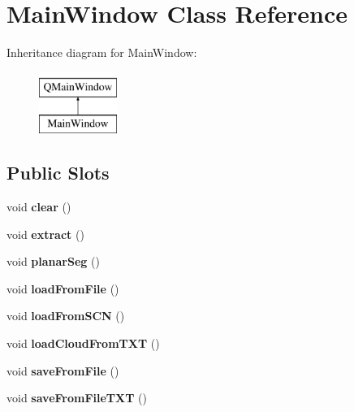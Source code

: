 \hypertarget{classMainWindow}{\section{Main\-Window Class Reference}
\label{classMainWindow}
}
Inheritance diagram for Main\-Window\-:\begin{figure}[H]
\begin{center}
\leavevmode
\includegraphics[height=2.000000cm]{classMainWindow}
\end{center}
\end{figure}
\subsection*{Public Slots}
\begin{DoxyCompactItemize}
\item 
\hypertarget{classMainWindow_a77557e32fb4ed3530daf2f6225c877db}{void {\bfseries clear} ()}\label{classMainWindow_a77557e32fb4ed3530daf2f6225c877db}

\item 
\hypertarget{classMainWindow_ad6bc77c2417da2a3728dd589c434dc6e}{void {\bfseries extract} ()}\label{classMainWindow_ad6bc77c2417da2a3728dd589c434dc6e}

\item 
\hypertarget{classMainWindow_ac47089e2ddbd6348bcd309f861da3a7d}{void {\bfseries planar\-Seg} ()}\label{classMainWindow_ac47089e2ddbd6348bcd309f861da3a7d}

\item 
\hypertarget{classMainWindow_a233bee15277ba8e4eebbb121bd547839}{void {\bfseries load\-From\-File} ()}\label{classMainWindow_a233bee15277ba8e4eebbb121bd547839}

\item 
\hypertarget{classMainWindow_a3052f4f925c5a0e4f8f6b7148e87ac01}{void {\bfseries load\-From\-S\-C\-N} ()}\label{classMainWindow_a3052f4f925c5a0e4f8f6b7148e87ac01}

\item 
\hypertarget{classMainWindow_ab89166f5ea7d7c22d475a83451819b5d}{void {\bfseries load\-Cloud\-From\-T\-X\-T} ()}\label{classMainWindow_ab89166f5ea7d7c22d475a83451819b5d}

\item 
\hypertarget{classMainWindow_a519b958c8619d8f7b3d97af8c70e70bb}{void {\bfseries save\-From\-File} ()}\label{classMainWindow_a519b958c8619d8f7b3d97af8c70e70bb}

\item 
\hypertarget{classMainWindow_aa05ba856ca3532f1c0f99d2bb74e9fb5}{void {\bfseries save\-From\-File\-T\-X\-T} ()}\label{classMainWindow_aa05ba856ca3532f1c0f99d2bb74e9fb5}

\end{DoxyCompactItemize}
